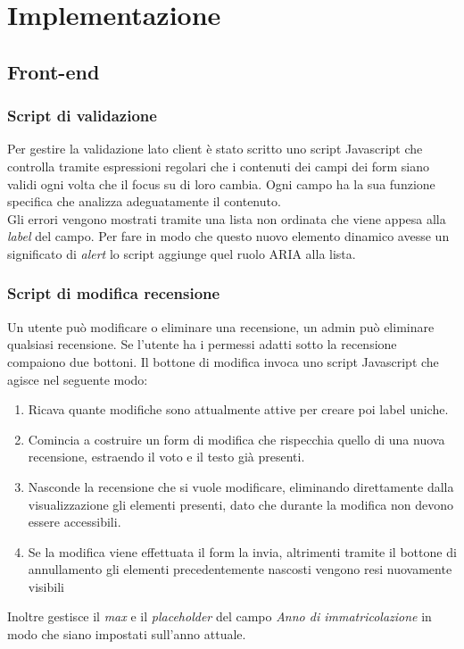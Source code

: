 \section{Implementazione}

\subsection{Front-end}

\subsubsection{Script di validazione}
Per gestire la validazione lato client è stato scritto uno script Javascript che controlla tramite espressioni regolari che i contenuti dei campi dei form siano validi ogni volta che il focus su di loro cambia. Ogni campo ha la sua funzione specifica che analizza adeguatamente il contenuto.\\ Gli errori vengono mostrati tramite una lista non ordinata che viene appesa alla \textit{label} del campo. Per fare in modo che questo nuovo elemento dinamico avesse un significato di \textit{alert} lo script aggiunge quel ruolo ARIA alla lista.

\subsubsection{Script di modifica recensione}
Un utente può modificare o eliminare una recensione, un admin può eliminare qualsiasi recensione. Se l'utente ha i permessi adatti sotto la recensione compaiono due bottoni. Il bottone di modifica invoca uno script Javascript che agisce nel seguente modo:
\begin{enumerate}
    \item Ricava quante modifiche sono attualmente attive per creare poi label uniche.
    \item Comincia a costruire un form di modifica che rispecchia quello di una nuova recensione, estraendo il voto e il testo già presenti.
    \item Nasconde la recensione che si vuole modificare, eliminando direttamente dalla visualizzazione gli elementi presenti, dato che durante la modifica non devono essere accessibili.
    \item Se la modifica viene effettuata il form la invia, altrimenti tramite il bottone di annullamento gli elementi precedentemente nascosti vengono resi nuovamente visibili 
\end{enumerate}
Inoltre gestisce il \textit{max} e il \textit{placeholder} del campo \textit{Anno di immatricolazione} in modo che siano impostati sull'anno attuale.

